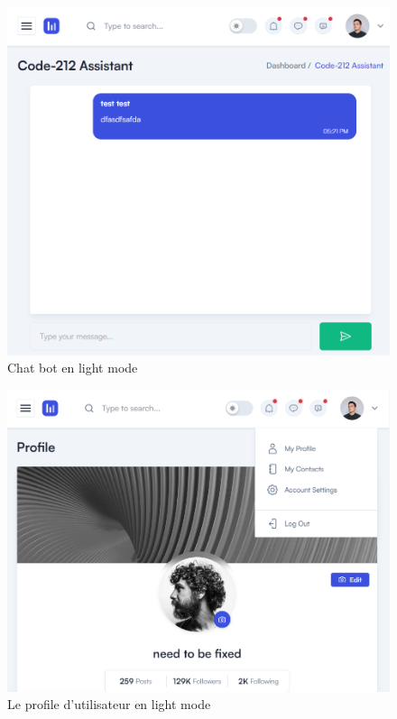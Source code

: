 \documentclass[a4paper, 11pt, openany]{report}
\begin{document}
\begin{figure}
\centering
\includegraphics[width=\textwidth]{assets/images/light-chat.png} 
\caption{Chat bot en light mode}
\label{fig:lightchat}
\end{figure}


\begin{figure}
\centering
\includegraphics[width=\textwidth]{assets/images/light-profile.png} 
\caption{Le profile d'utilisateur en light mode}
\label{fig:profile}
\end{figure}
\end{document}

